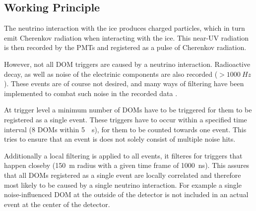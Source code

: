 \documentclass[a4paper,10pt]{scrartcl}
\begin{document}
\subsection{Working Principle}
\label{working-principle}

The neutrino interaction with the ice produces charged particles, which in turn emit Cherenkov radiation when interacting with the ice.
This near-UV radiation is then recorded by the PMTs and registered as a pulse of Cherenkov radiation.

However, not all DOM triggers are caused by a neutrino interaction.
Radioactive decay, as well as noise of the electrinic components are also recorded ($> \SI{1000}{Hz}$).
These events are of course not desired, and many ways of filtering have been implemented to combat such noise in the recorded data \cite{rasmus-master}.

At trigger level a minimum number of DOMs have to be triggered for them to be registered as a single event.
These triggers have to occur within a specified time interval (8 DOMs within \SI{5}{\mu s}), for them to be counted towards one event.
This tries to ensure that an event is does not solely consist of multiple noise hits.

Additionally a local filtering is applied to all events, it filteres for triggers that happen closeby (\SI{150}{m} radius with a given time frame of \SI{1000}{ns}).
This assures that all DOMs registered as a single event are locally correlated and therefore most likely to be caused by a single neutrino interaction.
For example a single noise-influenced DOM at the outside of the detector is not included in an actual event at the center of the detector.
\end{document}

